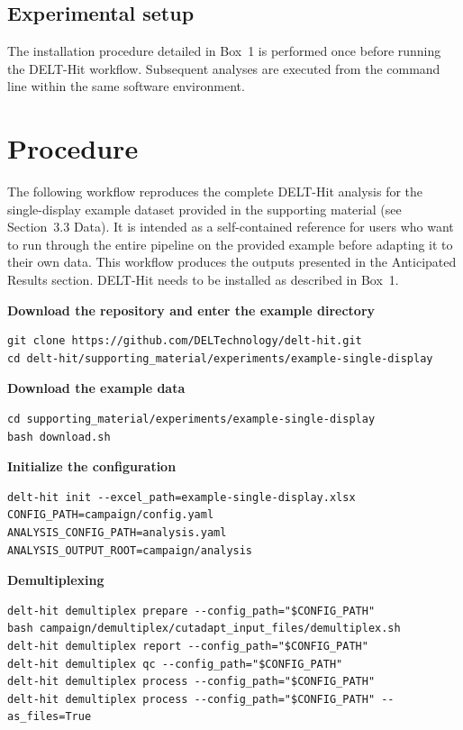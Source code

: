 \documentclass[pdflatex,sn-nature]{sn-jnl}
\newcommand{\setupitem}[1]{\par\medskip\noindent\textbf{#1}\par}
\begin{document}
\subsection{Experimental setup}
The installation procedure detailed in Box~1 is performed once before running the DELT-Hit workflow. Subsequent analyses are executed from the command line within the same software environment.

\section{Procedure}

\begin{tcolorbox}[
  colback=blue!5,
  colframe=blue!40,
  breakable,
  title=Box 2 | Quickstart: single-display example workflow,
  fonttitle=\bfseries
]

The following workflow reproduces the complete DELT-Hit analysis for the single-display example dataset provided in the supporting material (see Section~3.3 Data). It is intended as a self-contained reference for users who want to run through the entire pipeline on the provided example before adapting it to their own data. This workflow produces the outputs presented in the Anticipated Results section. DELT-Hit needs to be installed as described in Box~1.

\setupitem{Download the repository and enter the example directory}

\begin{lstlisting}
git clone https://github.com/DELTechnology/delt-hit.git
cd delt-hit/supporting_material/experiments/example-single-display
\end{lstlisting}

\setupitem{Download the example data}

\begin{lstlisting}
cd supporting_material/experiments/example-single-display
bash download.sh
\end{lstlisting}

\setupitem{Initialize the configuration}

\begin{lstlisting}
delt-hit init --excel_path=example-single-display.xlsx
CONFIG_PATH=campaign/config.yaml
ANALYSIS_CONFIG_PATH=analysis.yaml
ANALYSIS_OUTPUT_ROOT=campaign/analysis
\end{lstlisting}

\setupitem{Demultiplexing}

\begin{lstlisting}
delt-hit demultiplex prepare --config_path="$CONFIG_PATH"
bash campaign/demultiplex/cutadapt_input_files/demultiplex.sh
delt-hit demultiplex report --config_path="$CONFIG_PATH"
delt-hit demultiplex qc --config_path="$CONFIG_PATH"
delt-hit demultiplex process --config_path="$CONFIG_PATH"
delt-hit demultiplex process --config_path="$CONFIG_PATH" --as_files=True
\end{lstlisting}


\end{tcolorbox}
\end{document}
